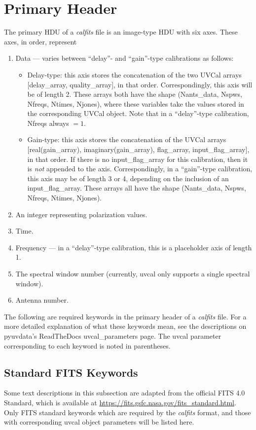 \documentclass[11pt, oneside, english]{article}   	%
\begin{document}
\section{Primary Header}\label{primary}
The primary HDU of a \emph{calfits} file is an image-type HDU with six axes.
These axes, in order, represent 
\begin{enumerate}
	\item{Data --- varies between ``delay''- and ``gain''-type calibrations as follows:}
	\begin{itemize}
	\item Delay-type: this axis stores the concatenation of the two UVCal arrays [delay\_array, quality\_array], in that order.
	Correspondingly, this axis will be of length 2.
	These arrays both have the shape (Nants\_data, Nspws, Nfreqs, Ntimes, Njones), where these variables take the values stored in the corresponding UVCal object. 
	Note that in a ``delay''-type calibration, Nfreqs always $=1$.
	\item Gain-type: this axis stores the concatenation of the UVCal arrays [real(gain\_array), imaginary(gain\_array), flag\_array, input\_flag\_array], in that order.
	If there is no input\_flag\_array for this calibration, then it is \emph{not} appended to the axis.
	Correspondingly, in a ``gain''-type calibration, this axis may be of length 3 or 4, depending on the inclusion of an input\_flag\_array.
	These arrays all have the shape (Nants\_data, Nspws, Nfreqs, Ntimes, Njones).
	\end{itemize}
	\item{An integer representing polarization values.}
	\item{Time.}
	\item{Frequency --- in a ``delay''-type calibration, this is a placeholder axis of length 1.}
	\item{The spectral window number (currently, uvcal only supports a single spectral window).}
	\item{Antenna number.}
\end{enumerate}

The following are required keywords in the primary header of a \emph{calfits} file.
For a more detailed explanation of what these keywords mean, see the descriptions on pyuvdata's ReadTheDocs uvcal\_parameters page. The uvcal parameter corresponding to each keyword is noted in parentheses. 
\subsection{Standard FITS Keywords}
Some text descriptions in this subsection are adapted from the official FITS 4.0 Standard, which is available at \url{https://fits.gsfc.nasa.gov/fits_standard.html}.
Only FITS standard keywords which are required by the \emph{calfits} format, and those with corresponding uvcal object parameters will be listed here.
\end{document}
